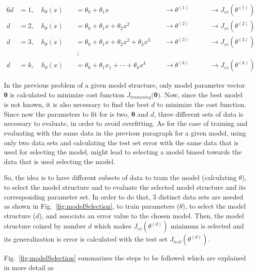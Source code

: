 \begin{alignat*}{6}
\label{eqn:exampCostFunc}
d &= 1, \quad h_{\theta}(x) \ && = \theta_0 + \theta_1 x\ \ && \longrightarrow \theta^{(1)}\ \ && \quad \longrightarrow J_{cv}(\theta^{(1)})\
\\
d &= 2, \quad h_{\theta}(x) \ && = \theta_0 + \theta_1 x + \theta_2 x^2 \ \ && \longrightarrow \theta^{(2)}\ \ && \quad \longrightarrow J_{cv}(\theta^{(2)})\
\\
d &= 3, \quad h_{\theta}(x) \ && = \theta_0 + \theta_1 x + \theta_2 x^2 + \theta_3 x^3\ \ && \longrightarrow \theta^{(3)}\ \ && \quad \longrightarrow J_{cv}(\theta^{(3)})\
\\
& \ &&\ \vdots \ &&\ \ &&\ 
\\
d &= k, \quad h_{\theta}(x) \ && = \theta_0 + \theta_1 x_1 + \cdots+ \theta_k x^k\ \ && \longrightarrow \theta^{(k)}\ \ && \quad \longrightarrow J_{cv}(\theta^{(k)})\
\end{alignat*}

In the previous problem of a given model structure, only model parameter vector $\bm{\theta}$ is calculated to minimize cost function $J_{tranining}(\bm{\theta)}$.
Now, since the best model is not known, it is also necessary to find the best $d$ to minimize the cost function. 
Since now the parameters to fit for is two, $\bm{\theta}$ and $d$, three different sets of data is necessary to evaluate, in order to avoid overfitting.
As for the case of training and evaluating with the same data in the previous paragraph for a given model, using only two data sets and calculating the test set error with the same data that is used for selecting the model, might lead to selecting a model biased towards the data that is used selecting the model.
 
So, the idea is to have different subsets of data to train the model (calculating $\theta$), to select the model structure and to evaluate the selected model structure and its corresponding parameter set. 
In order to do that, 3 distinct data sets are needed as shown in Fig.~\ref{fig:modelSelection}, to train parameters ($\theta$), to select the model structure ($d$), and associate an error value to the chosen model. 
Then, the model structure coined by number $d$ which makes $J_{cv}(\theta^{(d)})$ minimum is selected and its generalization is error is calculated with the test set $J_{test}(\theta^{(d)})$.

Fig.~\ref{fig:modelSelection} summarizes the steps to be followed which are explained in more detail as

